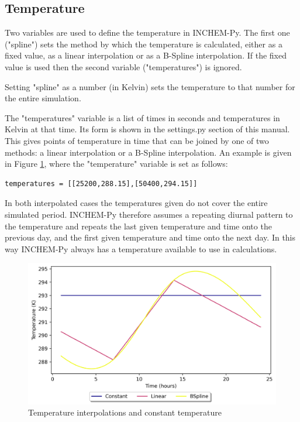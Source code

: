 \documentclass[a4paper]{refart}
\begin{document}
\subsection{Temperature}\label{Temperature}
Two variables are used to define the temperature in INCHEM-Py. The first one ("spline") sets the method by which the temperature is calculated, either as a fixed value, as a linear interpolation or as a B-Spline interpolation. If the fixed value is used then the second variable ("temperatures") is ignored. 

Setting "spline" as a number (in Kelvin) sets the temperature to that number for the entire simulation. 

The "temperatures" variable is a list of times in seconds and temperatures in Kelvin at that time. Its form is shown in the settings.py section of this manual.  This gives points of temperature in time that can be joined by one of two methods: a linear interpolation or a B-Spline interpolation. 
An example is given in Figure \ref{fig:temperature}, where the "temperature" variable is set as follows:
\begin{verbatim}
temperatures = [[25200,288.15],[50400,294.15]]
\end{verbatim}
In both interpolated cases the temperatures given do not cover the entire simulated period. INCHEM-Py therefore assumes a repeating diurnal pattern to the temperature and repeats the last given temperature and time onto the previous day, and the first given temperature and time onto the next day. In this way INCHEM-Py always has a temperature available to use in calculations. 

\begin{figure}
    \centering
    \includegraphics[width=\textwidth]{temperature.png}
    \caption{Temperature interpolations and constant temperature}
    \label{fig:temperature}
\end{figure}
\end{document}
